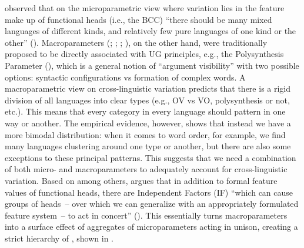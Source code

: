 \documentclass[output=paper,colorlinks,citecolor=brown]{langscibook}
\begin{document}
\citet{mm:baker_macroparameter_2008} observed that on the microparametric view where variation lies in the feature make up of functional heads (i.e., the BCC) ``there should be many mixed languages of different kinds, and relatively few pure languages of one kind or the other'' (\cite[350]{mm:baker_macroparameter_2008}). Macroparameters (\citealt{mm:baker_polysynthesis_1996}; \citeyear{mm:baker_macroparameter_2008}; \citealt{mm:boskovic_what_2008}; \citealt{mm:huang_syntactic_2015}), on the other hand, were traditionally proposed to be directly associated with UG principles, e.g., the Polysynthesis Parameter (\citealt{mm:baker_polysynthesis_1996}), which is a general notion of “argument visibility” with two possible options: syntactic configurations vs formation of complex words. A macroparametric view on cross-linguistic variation predicts that there is a rigid division of all languages into clear types (e.g., OV vs VO, polysynthesis or not, etc.). This means that every category in every language should pattern in one way or another. The empirical evidence, however, shows that instead we have a more bimodal distribution: when it comes to word order, for example, we find many languages clustering around one type or another, but there are also some exceptions to these principal patterns. This suggests that we need a combination of both micro- and macroparameters to adequately account for cross-linguistic variation. Based on \citet[10]{mm:kayne2005movement} among others, \citet{mm:roberts_parameter_2019} argues that in addition to formal feature values of functional heads, there are Independent Factors (IF) ``which can cause groups of heads~-- over which we can generalize with an appropriately formulated feature system~-- to act in concert'' (\cite[5]{mm:roberts_parameter_2019}). This essentially turns macroparameters into a surface effect of aggregates of microparameters acting in unison, creating a strict hierarchy of , shown in .
\end{document}
